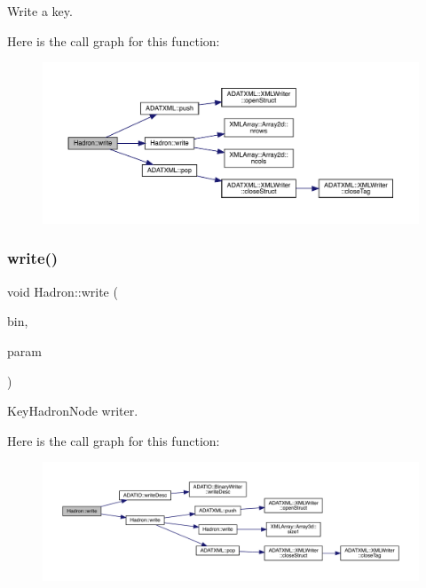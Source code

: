 Write a key. 

Here is the call graph for this function\+:
\nopagebreak
\begin{figure}[H]
\begin{center}
\leavevmode
\includegraphics[width=350pt]{d1/daf/namespaceHadron_a9d260315c8fc49d172ff22fd3abb49c9_cgraph}
\end{center}
\end{figure}
\mbox{\label{namespaceHadron_ae47780c59de1d15679cc11611947b313}} 
\subsubsection{\texorpdfstring{write()}{write()}\hspace{0.1cm}{\footnotesize\ttfamily [51/95]}}
{\footnotesize\ttfamily void Hadron\+::write (\begin{DoxyParamCaption}\item[{\mbox{\hyperlink{classADATIO_1_1BinaryWriter}{Binary\+Writer}} \&}]{bin,  }\item[{const \mbox{\hyperlink{structHadron_1_1KeyHadronNode__t_1_1Quark__t}{Key\+Hadron\+Node\+\_\+t\+::\+Quark\+\_\+t}} \&}]{param }\end{DoxyParamCaption})}



Key\+Hadron\+Node writer. 

Here is the call graph for this function\+:
\nopagebreak
\begin{figure}[H]
\begin{center}
\leavevmode
\includegraphics[width=350pt]{d1/daf/namespaceHadron_ae47780c59de1d15679cc11611947b313_cgraph}
\end{center}
\end{figure}
\mbox{\label{namespaceHadron_a12ff79f44bd22acfe6be486d4089262e}} 
